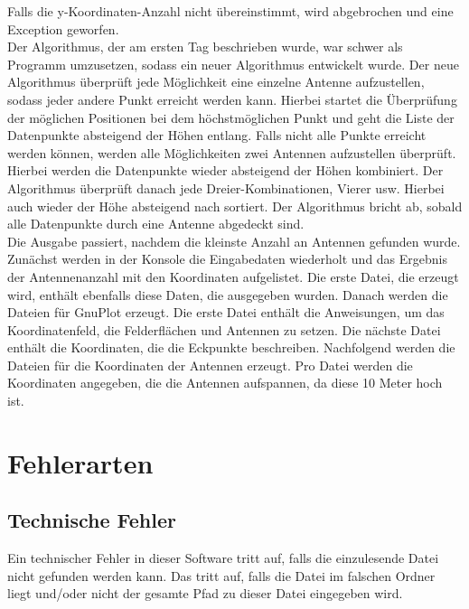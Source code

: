 Falls die y-Koordinaten-Anzahl nicht übereinstimmt, wird abgebrochen und eine Exception geworfen.
\\
Der Algorithmus, der am ersten Tag beschrieben wurde, war schwer als Programm umzusetzen, sodass ein neuer Algorithmus entwickelt wurde.
Der neue Algorithmus überprüft jede Möglichkeit eine einzelne Antenne aufzustellen, sodass jeder andere Punkt erreicht werden kann.
Hierbei startet die Überprüfung der möglichen Positionen bei dem höchstmöglichen Punkt und geht die Liste der Datenpunkte absteigend der Höhen entlang.
Falls nicht alle Punkte erreicht werden können, werden alle Möglichkeiten zwei Antennen aufzustellen überprüft.
Hierbei werden die Datenpunkte wieder absteigend der Höhen kombiniert.
Der Algorithmus überprüft danach jede Dreier-Kombinationen, Vierer usw.
Hierbei auch wieder der Höhe absteigend nach sortiert.
Der Algorithmus bricht ab, sobald alle Datenpunkte durch eine Antenne abgedeckt sind.
\\
Die Ausgabe passiert, nachdem die kleinste Anzahl an Antennen gefunden wurde.
Zunächst werden in der Konsole die Eingabedaten wiederholt und das Ergebnis der Antennenanzahl mit den Koordinaten aufgelistet.
Die erste Datei, die erzeugt wird, enthält ebenfalls diese Daten, die ausgegeben wurden.
Danach werden die Dateien für GnuPlot erzeugt.
Die erste Datei enthält die Anweisungen, um das Koordinatenfeld, die Felderflächen und Antennen zu setzen.
Die nächste Datei enthält die Koordinaten, die die Eckpunkte beschreiben.
Nachfolgend werden die Dateien für die Koordinaten der Antennen erzeugt.
Pro Datei werden die Koordinaten angegeben, die die Antennen aufspannen, da diese 10 Meter hoch ist.



\section{Fehlerarten}\label{sec:fehlerarten}

\subsection{Technische Fehler}\label{subsec:technische-fehler}
Ein technischer Fehler in dieser Software tritt auf, falls die einzulesende Datei nicht gefunden werden kann.
Das tritt auf, falls die Datei im falschen Ordner liegt und/oder nicht der gesamte Pfad zu dieser Datei eingegeben wird.

